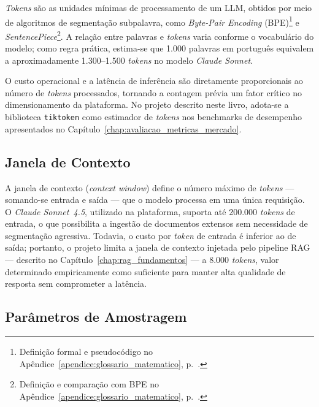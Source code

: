 \textit{Tokens} s\~ao as unidades m\'inimas de processamento de um LLM,
obtidos por meio de algoritmos de segmenta\c{c}\~ao subpalavra, como
\textit{Byte-Pair Encoding} (BPE)\footnote{%
  Defini\c{c}\~ao formal e pseudoc\'odigo no
  Ap\^endice~\ref{apendice:glossario_matematico}, p.~\pageref{sec:bpe}.} e
\textit{SentencePiece}\footnote{%
  Defini\c{c}\~ao e compara\c{c}\~ao com BPE no
  Ap\^endice~\ref{apendice:glossario_matematico}, p.~\pageref{sec:sentencepiece}.}. A rela\c{c}\~ao
entre palavras e \textit{tokens} varia conforme o vocabul\'ario do modelo;
como regra pr\'atica, estima-se que 1.000 palavras em portugu\^es equivalem
a aproximadamente 1.300--1.500 \textit{tokens} no modelo \textit{Claude
Sonnet}.

O custo operacional e a lat\^encia de infer\^encia s\~ao diretamente
proporcionais ao n\'umero de \textit{tokens} processados, tornando a
contagem pr\'evia um fator cr\'itico no dimensionamento da plataforma.
No projeto descrito neste livro, adota-se a biblioteca \texttt{tiktoken}
\cite{tiktoken2023} como estimador de \textit{tokens} nos benchmarks de
desempenho apresentados no Cap\'itulo~\ref{chap:avaliacao_metricas_mercado}.

\subsection{Janela de Contexto}

A janela de contexto (\textit{context window}) define o n\'umero m\'aximo
de \textit{tokens} --- somando-se entrada e sa\'ida --- que o modelo
processa em uma \'unica requisi\c{c}\~ao. O \textit{Claude Sonnet~4.5},
utilizado na plataforma, suporta at\'e 200.000 \textit{tokens} de entrada,
o que possibilita a ingest\~ao de documentos extensos sem necessidade de
segmenta\c{c}\~ao agressiva. Todavia, o custo por \textit{token} de entrada
\'e inferior ao de sa\'ida; portanto, o projeto limita a janela de
contexto injetada pelo pipeline RAG --- descrito no
Cap\'itulo~\ref{chap:rag_fundamentos} --- a 8.000 \textit{tokens}, valor
determinado empiricamente como suficiente para manter alta qualidade de
resposta sem comprometer a lat\^encia.

\subsection{Par\^ametros de Amostragem}

